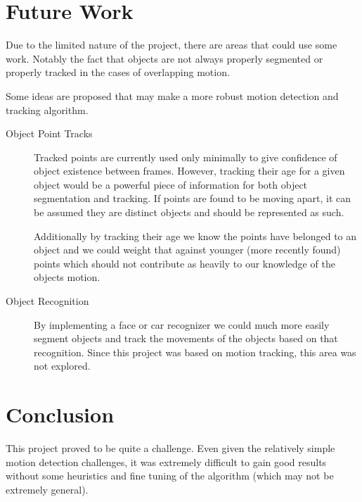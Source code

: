 \documentclass[11pt]{article}
\begin{document}
\section{Future Work}
Due to the limited nature of the project, there are areas that could use some work. Notably the fact that objects are not always properly segmented or properly tracked in the cases of overlapping motion.

Some ideas are proposed that may make a more robust motion detection and tracking algorithm.

\begin{description}
\item[Object Point Tracks] Tracked points are currently used only minimally to give confidence of object existence between frames. However, tracking their age for a given object would be a powerful piece of information for both object segmentation and tracking. If points are found to be moving apart, it can be assumed they are distinct objects and should be represented as such. 

Additionally by tracking their age we know the points have belonged to an object and we could weight that against younger (more recently found) points which should not contribute as heavily to our knowledge of the objects motion.

\item[Object Recognition] By implementing a face or car recognizer we could much more easily segment objects and track the movements of the objects based on that recognition. Since this project was based on motion tracking, this area was not explored.

\end{description}

\section{Conclusion}

This project proved to be quite a challenge. Even given the relatively simple motion detection challenges, it was extremely difficult to gain good results without some heuristics and fine tuning of the algorithm (which may not be extremely general). 
\end{document}
